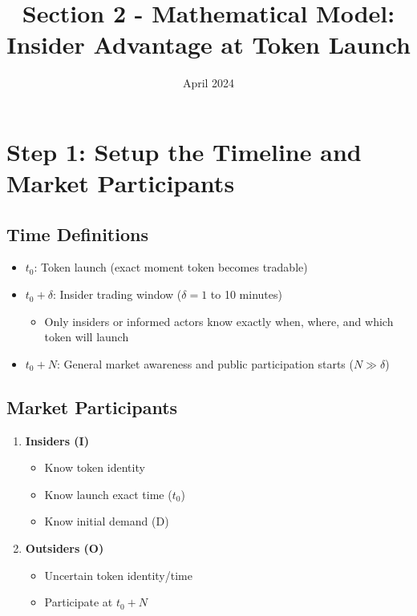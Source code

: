 \documentclass{article}
\title{Section 2 - Mathematical Model: Insider Advantage at Token Launch}
\date{April 2024}
\begin{document}

\section{Step 1: Setup the Timeline and Market Participants}

\subsection*{Time Definitions}
\begin{itemize}
    \item \textbf{$t_0$}: Token launch (exact moment token becomes tradable)
    \item \textbf{$t_0 + \delta$}: Insider trading window ($\delta = 1$ to 10 minutes)
        \begin{itemize}
            \item Only insiders or informed actors know exactly when, where, and which token will launch
        \end{itemize}
    \item \textbf{$t_0 + N$}: General market awareness and public participation starts ($N \gg \delta$)
\end{itemize}

\subsection*{Market Participants}
\begin{enumerate}
    \item \textbf{Insiders (I)}
        \begin{itemize}
            \item Know token identity
            \item Know launch exact time ($t_0$)
            \item Know initial demand (D)
        \end{itemize}
    \item \textbf{Outsiders (O)}
        \begin{itemize}
            \item Uncertain token identity/time
            \item Participate at $t_0 + N$
        \end{itemize}
\end{enumerate}
\end{document}
